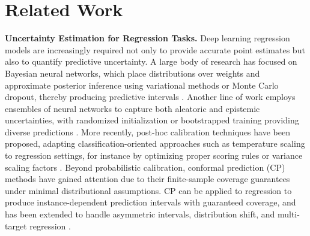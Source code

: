 \section{Related Work}
\label{related_work}


\textbf{Uncertainty Estimation for Regression Tasks.} Deep learning regression models are increasingly required not only to provide accurate point estimates but also to quantify predictive uncertainty. A large body of research has focused on Bayesian neural networks, which place distributions over weights and approximate posterior inference using variational methods or Monte Carlo dropout, thereby producing predictive intervals \cite{gal2016dropout}. Another line of work employs ensembles of neural networks to capture both aleatoric and epistemic uncertainties, with randomized initialization or bootstrapped training providing diverse predictions \cite{lakshminarayanan2017simple}. More recently, post-hoc calibration techniques have been proposed, adapting classification-oriented approaches such as temperature scaling to regression settings, for instance by optimizing proper scoring rules or variance scaling factors \cite{kuleshov2018accurate}. Beyond probabilistic calibration, conformal prediction (CP) methods have gained attention due to their finite-sample coverage guarantees under minimal distributional assumptions. CP can be applied to regression to produce instance-dependent prediction intervals with guaranteed coverage, and has been extended to handle asymmetric intervals, distribution shift, and multi-target regression \cite{vovk2005conformal,cqr2019,Nizhar2025}. 

